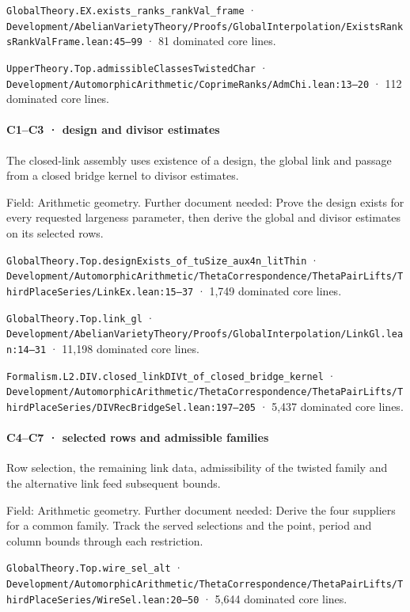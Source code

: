 \nolinkurl{GlobalTheory.EX.exists_ranks_rankVal_frame} · \nolinkurl{Development/AbelianVarietyTheory/Proofs/GlobalInterpolation/ExistsRanksRankValFrame.lean:45–99} · 81 dominated core lines.

\nolinkurl{UpperTheory.Top.admissibleClassesTwistedChar} · \nolinkurl{Development/AutomorphicArithmetic/CoprimeRanks/AdmChi.lean:13–20} · 112 dominated core lines.

\paragraph{C1–C3 · design and divisor estimates}

The closed-link assembly uses existence of a design, the global link and passage from a closed bridge kernel to divisor estimates.

Field: Arithmetic geometry. Further document needed: Prove the design exists for every requested largeness parameter, then derive the global and divisor estimates on its selected rows.

\nolinkurl{GlobalTheory.Top.designExists_of_tuSize_aux4n_litThin} · \nolinkurl{Development/AutomorphicArithmetic/ThetaCorrespondence/ThetaPairLifts/ThirdPlaceSeries/LinkEx.lean:15–37} · 1,749 dominated core lines.

\nolinkurl{GlobalTheory.Top.link_gl} · \nolinkurl{Development/AbelianVarietyTheory/Proofs/GlobalInterpolation/LinkGl.lean:14–31} · 11,198 dominated core lines.

\nolinkurl{Formalism.L2.DIV.closed_linkDIVt_of_closed_bridge_kernel} · \nolinkurl{Development/AutomorphicArithmetic/ThetaCorrespondence/ThetaPairLifts/ThirdPlaceSeries/DIVRecBridgeSel.lean:197–205} · 5,437 dominated core lines.

\paragraph{C4–C7 · selected rows and admissible families}

Row selection, the remaining link data, admissibility of the twisted family and the alternative link feed subsequent bounds.

Field: Arithmetic geometry. Further document needed: Derive the four suppliers for a common family. Track the served selections and the point, period and column bounds through each restriction.

\nolinkurl{GlobalTheory.Top.wire_sel_alt} · \nolinkurl{Development/AutomorphicArithmetic/ThetaCorrespondence/ThetaPairLifts/ThirdPlaceSeries/WireSel.lean:20–50} · 5,644 dominated core lines.

